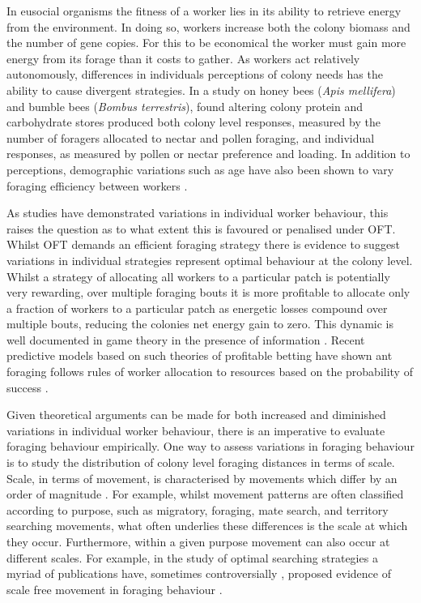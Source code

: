 \documentclass[11pt,usenames,dvipsnames]{article}
\begin{document}
In eusocial organisms the fitness of a worker lies in its ability to retrieve energy from the environment. In doing so, workers increase both the colony biomass and the number of gene copies. For this to be economical the worker must gain more energy from its forage than it costs to gather. As workers act relatively autonomously, differences in individuals perceptions of colony needs has the ability to cause divergent strategies. In a study on honey bees (\textit{Apis mellifera}) and bumble bees (\textit{Bombus terrestris}), \cite{Hendriksma2019} found altering colony protein and carbohydrate stores produced both colony level responses, measured by the number of foragers allocated to nectar and pollen foraging, and individual responses, as measured by pollen or nectar preference and loading. In addition to perceptions, demographic variations such as age have also been shown to vary foraging efficiency between workers \citep{Schippers2006, Klein2019}.

As studies have demonstrated variations in individual worker behaviour, this raises the question as to what extent this is favoured or penalised under OFT. Whilst OFT demands an efficient foraging strategy there is evidence to suggest variations in individual strategies represent optimal behaviour at the colony level. Whilst a strategy of allocating all workers to a particular patch is potentially very rewarding, over multiple foraging bouts it is more profitable to allocate only a fraction of workers to a particular patch as energetic losses compound over multiple bouts, reducing the colonies net energy gain to zero. This dynamic is well documented in game theory in the presence of information \citep{Kelly1956}. Recent predictive models based on such theories of profitable betting have shown ant foraging follows rules of worker allocation to resources based on the probability of success \citep{Baddeley2019}.

Given theoretical arguments can be made for both increased and diminished variations in individual worker behaviour, there is an imperative to evaluate foraging behaviour empirically. One way to assess variations in foraging behaviour is to study the distribution of colony level foraging distances in terms of scale. Scale, in terms of movement, is characterised by movements which differ by an order of magnitude \citep{Levin1992}. For example, whilst movement patterns are often classified according to purpose, such as migratory, foraging, mate search, and territory searching movements, what often underlies these differences is the scale at which they occur. Furthermore, within a given purpose movement can also occur at different scales. For example, in the study of optimal searching strategies a myriad of publications have, sometimes controversially \citep{Viswanathan1996}, proposed evidence of scale free movement in foraging behaviour \citep{Harris2012, Ariel2015, Humphries2010, Baronchelli2013, Boyer, Ayala-Orozco2004, Sims2008, Viswanathan1999}.
\end{document}
